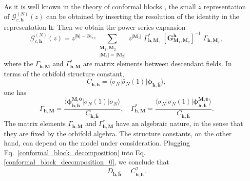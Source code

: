 \documentclass[a4paper,11pt]{article}
\begin{document}
As it is well known in the theory of conformal blocks \cite{DiFrancesco}, the small $z$ representation of $\mathcal{G}_{c, \boldsymbol{h}}^{(N)}(z)$ can be obtained by inserting the resolution of the identity in the representation $\boldsymbol{h}$. Then we obtain the power series expansion
\begin{equation}\label{conformal_block_decomposition}
 \mathcal{G}_{c,\boldsymbol{h}}^{(N)}(z)=
 z^{|\boldsymbol{h}|-2h_{\sigma_N}}\sum_{\substack{\boldsymbol{M}_1, \boldsymbol{M}_2 \\ |\boldsymbol{M}_1|=|\boldsymbol{M}_2|} } z^{|\boldsymbol{M}_1|}\;\Gamma^{*}_{\boldsymbol{h}, \boldsymbol{M}_1}\; [\boldsymbol{G}^{\boldsymbol{h}}_{\boldsymbol{M}_1,\boldsymbol{M}_2}]^{-1}\;\Gamma_{\boldsymbol{h},\boldsymbol{M}_2},
\end{equation}
where the $\Gamma_{\boldsymbol{h},\boldsymbol{M}}$ and $\Gamma^{*}_{\boldsymbol{h},\boldsymbol{M}}$ are matrix elements between descendant fields. In terms of the orbifold structure constant,
\begin{equation}
\label{strucconst}
C_{\boldsymbol{h},\boldsymbol{\bar{h}}}=\langle  \sigma_{N}|\bar{\sigma}_{N}(1)|\boldsymbol{\phi}_{\boldsymbol{h},\boldsymbol{\bar{h}}}\rangle,
\end{equation}
one has
 \begin{equation}
 \label{Gammas}
\Gamma_{\boldsymbol{h},\boldsymbol{M}} = \frac{\langle \boldsymbol{\phi}^{\boldsymbol{M},\boldsymbol{0}}_{\boldsymbol{h},\boldsymbol{\bar{h}}}| \sigma_{N}(1)|\bar{\sigma}_{N}\rangle}{C_{\boldsymbol{h},\boldsymbol{\bar{h}}}},\quad  \Gamma^{*}_{\boldsymbol{h},\boldsymbol{M}} = \frac{\langle  \sigma_{N}|\bar{\sigma}_{N}(1)|\boldsymbol{\phi}^{\boldsymbol{M},\boldsymbol{0}}_{\boldsymbol{h},\boldsymbol{\bar{h}}}\rangle}{C_{\boldsymbol{h},\boldsymbol{\bar{h}}}} .
 \end{equation}
 The matrix elements  $\Gamma_{\boldsymbol{h},\boldsymbol{M}}$ and $\Gamma^{*}_{\boldsymbol{h},\boldsymbol{M}}$ have an algebraic nature, in the sense that they are fixed by the orbifold algebra. The structure constants, on the other hand, can depend on the model under consideration. Plugging Eq.~\eqref{conformal_block_decomposition} into Eq.\eqref{conformal_block_decomposition_0}, we conclude that 
 \begin{equation}
 \label{DC}
 D_{\boldsymbol{h},\boldsymbol{\bar{h}}}= C_{\boldsymbol{h},\boldsymbol{\bar{h}}}^2.
 \end{equation}
\end{document}
